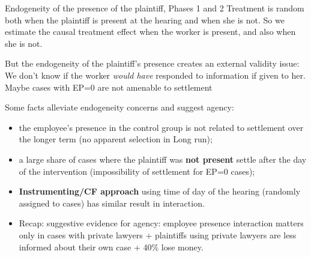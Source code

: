 \documentclass[9pt]{beamer}
\begin{document}
 \begin{frame}{Endogeneity of the presence of the plaintiff, Phases 1 and 2}
 \label{frame_Control_Function}
    Treatment is random both when the plaintiff is present at the hearing and when she is not. So we estimate the causal treatment effect when the worker is present, and also when she is not.

    \vspace{.1in}
   But the endogeneity of the plaintiff's presence creates an external validity issue: %
   We don't know if the worker \textit{would have} responded to information if given to her. 
   Maybe cases with EP=0 are not amenable to settlement
   
   \pause
   \vspace{.1in}
   Some facts alleviate endogeneity concerns and suggest agency:
   \pause
   \begin{itemize}
    \item the employee's presence in the control group is not related to settlement over the longer term (no apparent selection in Long run);
    \pause
       \item a large share of cases where the plaintiff was \textbf{not present} settle after the day of the intervention (\no impossibility of settlement for EP=0 cases);
    \pause
       \item \textbf{Instrumenting/CF approach} using time of day of the hearing (randomly assigned to cases) has similar result in interaction. \hyperlink{frame_Table3E}{}
       \pause
       \item Recap: suggestive evidence for agency: employee presence interaction matters only in cases with private lawyers + plaintiffs using private lawyers are less informed about their own case + 40\% lose money.
   \end{itemize}

      \vspace{1mm}
      
\end{frame}
\end{document}
